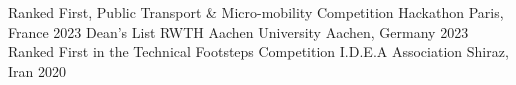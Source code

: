 


\begin{cvhonors}

  \cvhonor
    {Ranked First, Public Transport \& Micro-mobility Competition} %
    {Hackathon} %
    {Paris, France} %
    {2023} %
  \cvhonor
    {Dean's List} %
    {RWTH Aachen University} %
    {Aachen, Germany} %
    {2023} %
  \cvhonor
    {Ranked First in the Technical Footsteps Competition} %
    {I.D.E.A Association} %
    {Shiraz, Iran} %
    {2020} %
\end{cvhonors}